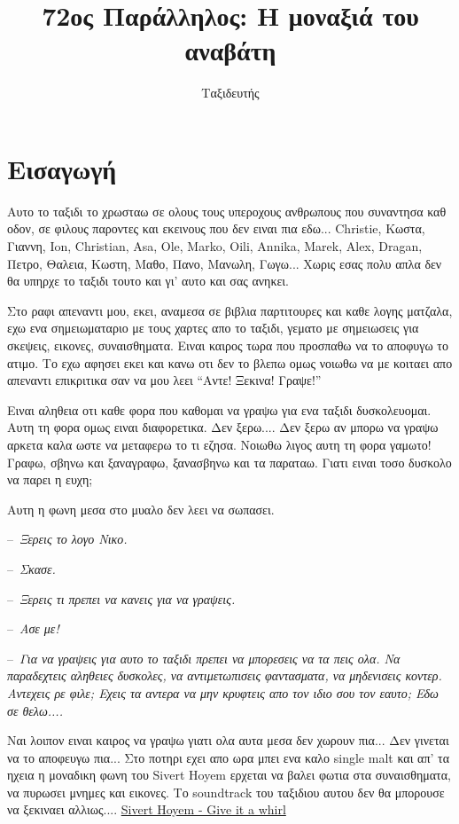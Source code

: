 \documentclass[11pt, letterpaper]{book}
\title{72ος Παράλληλος: Η μοναξιά του αναβάτη}
\author{Ταξιδευτής}
\newcommand\dialogue[1]{\par\noindent--~\textit{#1}}
\begin{document}
\maketitle
\tableofcontents

\chapter{Εισαγωγή}

Αυτο το ταξιδι το χρωσταω σε ολους τους υπεροχους ανθρωπους που συναντησα καθ οδον, σε φιλους παροντες και εκεινους που δεν ειναι πια εδω... Christie, Κωστα, Γιαννη, Ion, Christian, Asa, Οle, Marko, Oili, Annika, Marek, Αlex, Dragan, Πετρο, Θαλεια, Κωστη, Μαθο, Πανο, Μανωλη, Γωγω... Χωρις εσας πολυ απλα δεν θα υπηρχε το ταξιδι τουτο και γι' αυτο και σας ανηκει.

Στο ραφι απεναντι μου, εκει, αναμεσα σε βιβλια παρτιτουρες και καθε λογης ματζαλα, εχω ενα σημειωματαριο με τους χαρτες απο το ταξιδι, γεματο με σημειωσεις για σκεψεις, εικονες, συναισθηματα. Ειναι καιρος τωρα που προσπαθω να το αποφυγω το ατιμο. Το εχω αφησει εκει και κανω οτι δεν το βλεπω ομως νοιωθω να με κοιταει απο απεναντι επικριτικα σαν να μου λεει ``Αντε! Ξεκινα! Γραψε!''

Ειναι αληθεια οτι καθε φορα που καθομαι να γραψω για ενα ταξιδι δυσκολευομαι. Αυτη τη φορα ομως ειναι διαφορετικα. Δεν ξερω....
Δεν ξερω αν μπορω να γραψω αρκετα καλα ωστε να μεταφερω το τι εζησα. Νοιωθω λιγος αυτη τη φορα γαμωτο!
Γραφω, σβηνω και ξαναγραφω, ξανασβηνω και τα παραταω. Γιατι ειναι τοσο δυσκολο να παρει η ευχη;

Αυτη η φωνη μεσα στο μυαλο δεν λεει να σωπασει.

\dialogue{Ξερεις το λογο Νικο.}
\dialogue{Σκασε.}
\dialogue{Ξερεις τι πρεπει να κανεις για να γραψεις.}
\dialogue{Ασε με!}
\dialogue{Για να γραψεις για αυτο το ταξιδι πρεπει να μπορεσεις να τα πεις ολα. Να παραδεχτεις αληθειες δυσκολες, να αντιμετωπισεις φαντασματα, να μηδενισεις κοντερ. Αντεχεις ρε φιλε; Εχεις τα αντερα να μην κρυφτεις απο τον ιδιο σου τον εαυτο; Εδω σε θελω....}

Ναι λοιπον ειναι καιρος να γραψω γιατι ολα αυτα μεσα δεν χωρουν πια...
Δεν γινεται να το αποφευγω πια... Στο ποτηρι εχει απο ωρα μπει ενα καλο single malt και απ' τα ηχεια η μοναδικη φωνη του Sivert Hoyem ερχεται να βαλει φωτια στα συναισθηματα, να πυρωσει μνημες και εικονες. Το soundtrack του ταξιδιου αυτου δεν θα μπορουσε να ξεκιναει αλλιως.... \href{http://goo.gl/xUsd7}{Sivert Hoyem - Give it a whirl}
\end{document}
